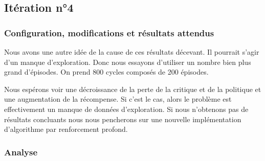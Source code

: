 \subsection{Itération n°4}

\subsubsection{Configuration, modifications et résultats attendus}

Nous avons une autre idée de la cause de ces résultats décevant. Il pourrait s'agir d'un manque d'exploration. Donc nous essayons d'utiliser un nombre bien plus grand d'épisodes. On prend 800 cycles composés de 200 épisodes.

Nous espérons voir une décroissance de la perte de la critique et de la politique et une augmentation de la récompense. Si c'est le cas, alors le problème est effectivement un manque de données d'exploration. Si nous n'obtenons pas de résultats concluants nous nous pencherons sur une nouvelle implémentation d'algorithme par renforcement profond.

\subsubsection{Analyse}

